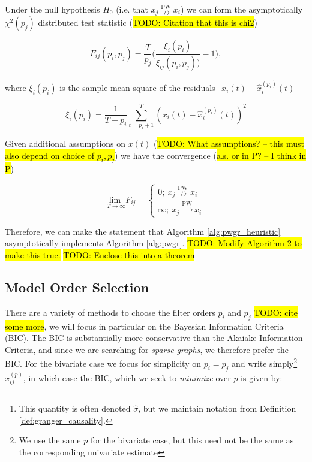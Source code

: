 \documentclass[12pt]{article}
\def\pwgc{\overset{\text{PW}}{\rightarrow}}  %
\def\npwgc{\overset{\text{PW}}{\nrightarrow}}  %
\begin{document}
Under the null hypothesis $H_0$ (i.e. that $x_j \npwgc x_i$) we can
form the asymptotically $\chi^2(p_j)$ distributed test statistic
(\hl{TODO: Citation that this is chi2})

\begin{equation}
  \label{eqn:gc_statistics}
  F_{ij}(p_i, p_j) = \frac{T}{p_j}\Big(\frac{\xi_i(p_i)}{\xi_{ij}(p_i, p_j))} - 1\Big),
\end{equation}

where $\xi_i(p_i)$ is the sample mean square of the residuals\footnote{This
  quantity is often denoted $\widehat{\sigma}$, but we maintain
  notation from Definition \ref{def:granger_causality}.}
$x_i(t) - \widehat{x}^{(p_i)}_i(t)$

\begin{equation*}
  \xi_i(p_i) = \frac{1}{T - p_i}\sum_{t = p_i + 1}^T (x_i(t) - \widehat{x}_i^{(p_i)}(t))^2
\end{equation*}

Given additional assumptions on $x(t)$ (\hl{TODO: What assumptions? --
  this must also depend on choice of $p_i, p_j$}) we have the
convergence (\hl{a.s. or in P?  -- I think in P})

\begin{equation}
  \underset{T \rightarrow \infty}{\text{lim }}F_{ij} =
  \left\{
    \begin{array}{ll}
      0;\ x_j \npwgc x_i\\
      \infty;\ x_j \pwgc x_i
    \end{array}
  \right.
\end{equation}

Therefore, we can make the statement that Algorithm
\ref{alg:pwgr_heuristic} asymptotically implements Algorithm
\ref{alg:pwgr}.  \hl{TODO: Modify Algorithm 2 to make this true.}
\hl{TODO: Enclose this into a theorem}

\subsection{Model Order Selection}
\label{sec:model_order_selection}
There are a variety of methods to choose the filter orders $p_i$ and
$p_j$ \hl{TODO: cite some more}, we will focus in particular on the
Bayesian Information Criteria (BIC).  The BIC is substantially more
conservative than the Akaiake Information Criteria, and since we are
searching for \textit{sparse graphs}, we therefore prefer the BIC. For
the bivariate case we focus for simplicity on $p_i = p_j$ and write
simply\footnote{We use the same $p$ for the bivariate case, but this
  need not be the same as the corresponding univariate estimate}
$x_{ij}^{(p)}$, in which case the BIC, which we seek to
\textit{minimize} over $p$ is given by:
\end{document}
